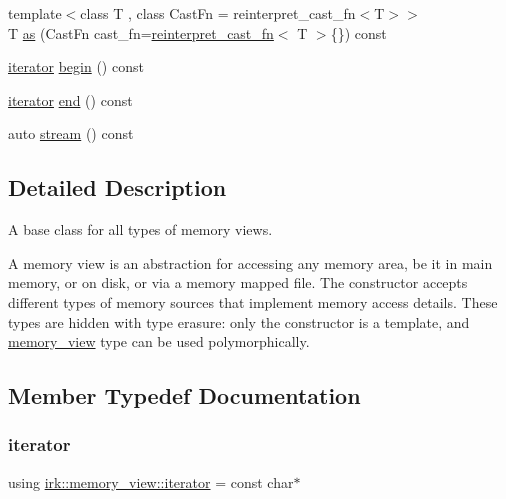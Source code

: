 \begin{DoxyCompactItemize}
{\footnotesize template$<$class T , class Cast\+Fn  = reinterpret\+\_\+cast\+\_\+fn$<$\+T$>$$>$ }\\T \mbox{\hyperlink{classirk_1_1memory__view_ae9d042dabe259ef35ac2fec319c40b57}{as}} (Cast\+Fn cast\+\_\+fn=\mbox{\hyperlink{structirk_1_1reinterpret__cast__fn}{reinterpret\+\_\+cast\+\_\+fn}}$<$ T $>$\{\}) const
\item 
\mbox{\hyperlink{classirk_1_1memory__view_a425bdc98ffa1c1c6cb018b3b4ad64317}{iterator}} \mbox{\hyperlink{classirk_1_1memory__view_a41d2227984ac0284ec52588a57bd297c}{begin}} () const
\item 
\mbox{\hyperlink{classirk_1_1memory__view_a425bdc98ffa1c1c6cb018b3b4ad64317}{iterator}} \mbox{\hyperlink{classirk_1_1memory__view_a393e04a837ff706e408fbea11219d7ed}{end}} () const
\item 
auto \mbox{\hyperlink{classirk_1_1memory__view_a4e324d9edda27a3125d2ab364d1e5552}{stream}} () const
\end{DoxyCompactItemize}


\subsection{Detailed Description}
A base class for all types of memory views. 

A memory view is an abstraction for accessing any memory area, be it in main memory, or on disk, or via a memory mapped file. The constructor accepts different types of memory sources that implement memory access details. These types are hidden with type erasure\+: only the constructor is a template, and {\ttfamily \mbox{\hyperlink{classirk_1_1memory__view}{memory\+\_\+view}}} type can be used polymorphically. 

\subsection{Member Typedef Documentation}
\mbox{\label{classirk_1_1memory__view_a425bdc98ffa1c1c6cb018b3b4ad64317}} 
\subsubsection{\texorpdfstring{iterator}{iterator}}
{\footnotesize\ttfamily using \mbox{\hyperlink{classirk_1_1memory__view_a425bdc98ffa1c1c6cb018b3b4ad64317}{irk\+::memory\+\_\+view\+::iterator}} =  const char$\ast$}


